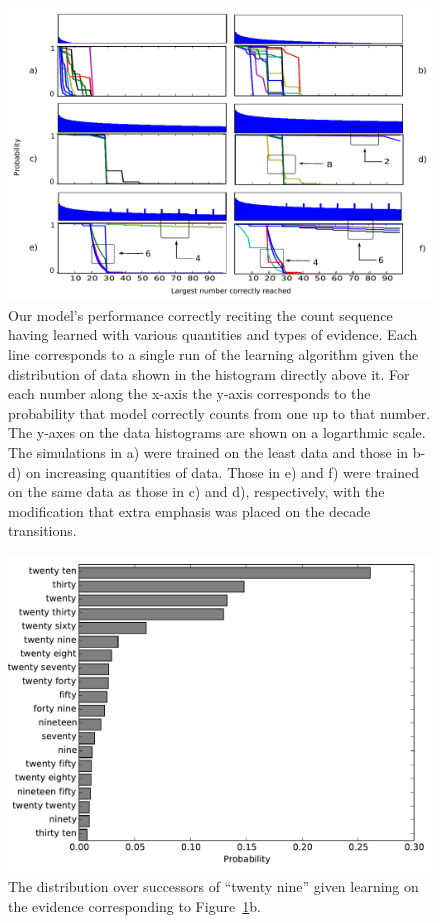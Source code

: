 \documentclass[10pt,letterpaper]{article}
\begin{document}
\begin{figure}[t]
\includegraphics[width=\linewidth]{figures/counting_grid2}
\caption{Our model's performance correctly reciting the count sequence
  having learned with various quantities and types of evidence. Each
  line corresponds to a single run of the learning algorithm given the
  distribution of data shown in the histogram directly above it. For
  each number along the x-axis the y-axis corresponds to the
  probability that model correctly counts from one up to that
  number. The y-axes on the data histograms are shown on a logarthmic
  scale. The simulations in a) were trained on the least data and
  those in b-d) on increasing quantities of data. Those in e) and f)
  were trained on the same data as those in c) and d), respectively,
  with the modification that extra emphasis was placed on the decade
  transitions. \label{fig:counting_grid}}
\end{figure}


\begin{figure}
\includegraphics[width=0.9\linewidth]{figures/after29}
\caption{The distribution over successors of ``twenty nine'' given learning on the evidence corresponding to Figure~\ref{fig:counting_grid}b. \label{fig:after29}}
\end{figure}
\end{document}
